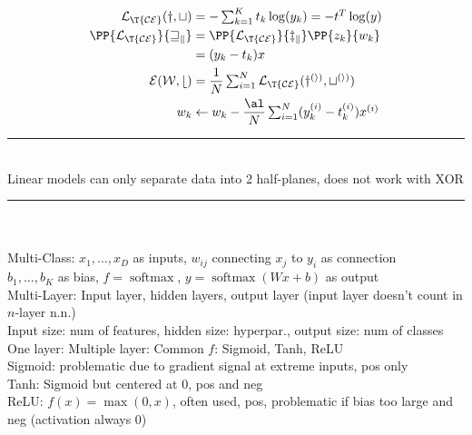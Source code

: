 \documentclass[10pt]{CheatSheet/hw}
\begin{document}
\begin{multicols*}{5}
\begin{align*}
    \cal{L}_{\T{CE}}(y,t)&=-\textstyle\sum_{k=1}^K t_k\log(y_k)=-t^T\log(y)\\
    \PP{\cal{L}_{\T{CE}}}{w_k}&=\PP{\cal{L}_{\T{CE}}}{z_k}\PP{z_k}{w_k}\\
    &=(y_k-t_k)x\\
    \cal{E}(W,b)&=\frac1N\textstyle\sum_{i=1}^N\cal{L}_{\T{CE}}(y^{(i)},t^{(i)})\\
    w_k&\gets w_k-\frac{\al}{N}\textstyle\sum_{i=1}^N(y_k^{(i)}-t_k^{(i)})x^{(i)}
\end{align*}
\rule{\linewidth}{0.4pt}\\
Linear models can only separate data into 2 half-planes, does not work with XOR
\rule{\linewidth}{0.4pt}\\
\\
Multi-Class: $x_1,...,x_D$ as inputs, $w_{ij}$ connecting $x_j$ to $y_i$ as connection\\
$b_1,...,b_K$ as bias, $f=\operatorname{softmax}$, $y=\operatorname{softmax}(Wx+b)$ as output\\
Multi-Layer: Input layer, hidden layers, output layer (input layer doesn't count in $n$-layer n.n.)\\
Input size: num of features, hidden size: hyperpar., output size: num of classes\\
One layer:
\vspace{-5pt}
\vspace{-5pt}
Multiple layer:
\vspace{-5pt}
\vspace{-5pt}
Common $f$: Sigmoid, Tanh, ReLU\\
Sigmoid: problematic due to gradient signal at extreme inputs, pos only\\
Tanh: Sigmoid but centered at 0, pos and neg\\
ReLU: $f(x)=\max(0,x)$, often used, pos, problematic if bias too large and neg (activation always 0)\\

\end{multicols*}
\end{document}
